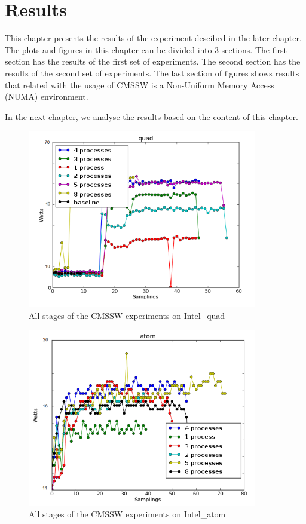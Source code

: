 \chapter{Results}

This chapter presents the results of the experiment descibed in the later chapter. The plots and figures in this chapter can be divided into 3 sections. The first section has the results of the first set of experiments. The second section has the results of the second set of experiments. The last section of figures shows results that related with the usage of CMSSW is a Non-Uniform Memory Access (NUMA) environment.


In the next chapter, we analyse the results based on the content of this chapter.

\begin{figure}[h!]
  \centering
    \includegraphics[width=100mm]{"img/aalto/aalto_total_quad"}
    \caption{All stages of the CMSSW experiments on Intel\_quad}
    \label{fig:aalto_quad_clamp}
\end{figure}

\begin{figure}[h!]
  \centering
    \includegraphics[width=100mm]{"img/aalto/aalto_total_atom"}
    \caption{All stages of the CMSSW experiments on Intel\_atom}
    \label{fig:aalto_atom_clamp}
\end{figure}

